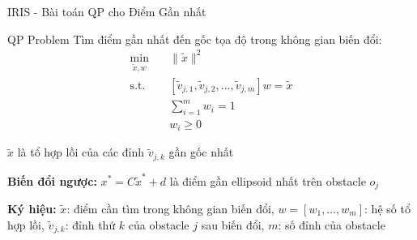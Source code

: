 \documentclass[aspectratio=169]{beamer}
\begin{document}
\begin{frame}{IRIS - Bài toán QP cho Điểm Gần nhất}
    
    \begin{block}{QP Problem}
        \small
        Tìm điểm gần nhất đến gốc tọa độ trong không gian biến đổi:
        \[
            \begin{aligned}
                \min_{\tilde{x}, w} \quad & \|\tilde{x}\|^2                \\
                \text{s.t.} \quad         & [\tilde{v}_{j,1}, \tilde{v}_{j,2}, \ldots, \tilde{v}_{j,m}]w = \tilde{x} \\
                                          & \sum_{i=1}^{m} w_i = 1 \\
                                          & w_i \geq 0
            \end{aligned}
        \]
        
        $\tilde{x}$ là tổ hợp lồi của các đỉnh $\tilde{v}_{j,k}$ gần gốc nhất
    \end{block}

    \vspace{0.5em}
    \textbf{Biến đổi ngược:} $x^* = C\tilde{x}^* + d$ là điểm gần ellipsoid nhất trên obstacle $o_j$

    \vspace{0.3em}
    {\small
    \textbf{Ký hiệu:}
    $\tilde{x}$: điểm cần tìm trong không gian biến đổi,
    $w = [w_1, \ldots, w_m]$: hệ số tổ hợp lồi,
    $\tilde{v}_{j,k}$: đỉnh thứ $k$ của obstacle $j$ sau biến đổi,
    $m$: số đỉnh của obstacle
    }

    
    
\end{frame}
\end{document}
